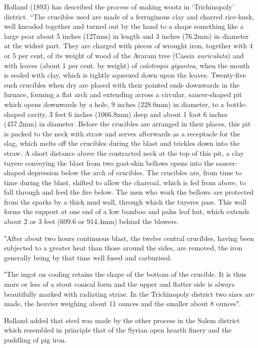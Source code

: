Holland (1893) has described the process of making wootz in ‘Trichinopoly’ district. “The crucibles used are made of a ferruginous clay and charred rice-husk, well kneaded together and turned out by the hand to a shape something like a large pear about 5 inches (127mm) in length and 3 inches (76.2mm) in diameter at the widest part. They are charged with pieces of wrought iron, together with 4 or 5 per cent, of its weight of wood of the Avaram tree (Cassia {\it auriculata}) and with leaves (about 1 per cent. by weight) of {\it calotropis gigantea}, when the mouth is sealed with clay, which is tightly squeezed down upon the leaves. Twenty-five such crucibles when dry are placed with their pointed ends downwards in the furnace, forming a flat arch and extending across a circular, saucer-shaped pit which opens downwards by a hole, 9 inches (228.6mm) in diameter, to a bottle- shaped cavity, 3 feet 6 inches (1066.8mm) deep and about 1 foot 6 inches (457.2mm) in diameter. Before the crucibles are arranged in their places, this pit is packed to the neck with straw and serves afterwards as a receptacle for the slag, which melts off the crucibles during the blast and trickles down into the straw. A short distance above the contracted neck at the top of this pit, a clay tuyere conveying the blast from two goat-skin bellows opens into the saucer-shaped depression below the arch of crucibles. The crucibles are, from time to time during the blast, shifted to allow the charcoal, which is fed from above, to fall through and feed the fire below. The men who work the bellows are protected from the sparks by a thick mud wall, through which the tuyeres pass. This wall forms the support at one end of a low bamboo and palm leaf hut, which extends about 2 or 3 feet (609.6 or 914.4mm) behind the blowers.

"After about two hours continuous blast, the twelve central crucibles, having been subjected to a greater heat than those around the sides, are removed, the iron generally being by that time well fused and carburised. 

"The ingot on cooling retains the shape of the bottom of the crucible. It is thus more or less of a stout conical form and the upper and flatter side is always beautifully marked with radiating striae. In the Trichinopoly district two sizes are made, the heavier weighing about 11 ounces and the smaller about 8 ounces".

Holland added that steel was made by the other process in the Salem district which resembled in principle that of the Syrian open hearth finery and the puddling of pig iron. 

